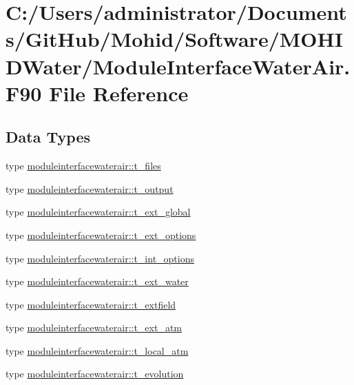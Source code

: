 \hypertarget{_module_interface_water_air_8_f90}{}\section{C\+:/\+Users/administrator/\+Documents/\+Git\+Hub/\+Mohid/\+Software/\+M\+O\+H\+I\+D\+Water/\+Module\+Interface\+Water\+Air.F90 File Reference}
\label{_module_interface_water_air_8_f90}
\subsection*{Data Types}
\begin{DoxyCompactItemize}
\item 
type \mbox{\hyperlink{structmoduleinterfacewaterair_1_1t__files}{moduleinterfacewaterair\+::t\+\_\+files}}
\item 
type \mbox{\hyperlink{structmoduleinterfacewaterair_1_1t__output}{moduleinterfacewaterair\+::t\+\_\+output}}
\item 
type \mbox{\hyperlink{structmoduleinterfacewaterair_1_1t__ext__global}{moduleinterfacewaterair\+::t\+\_\+ext\+\_\+global}}
\item 
type \mbox{\hyperlink{structmoduleinterfacewaterair_1_1t__ext__options}{moduleinterfacewaterair\+::t\+\_\+ext\+\_\+options}}
\item 
type \mbox{\hyperlink{structmoduleinterfacewaterair_1_1t__int__options}{moduleinterfacewaterair\+::t\+\_\+int\+\_\+options}}
\item 
type \mbox{\hyperlink{structmoduleinterfacewaterair_1_1t__ext__water}{moduleinterfacewaterair\+::t\+\_\+ext\+\_\+water}}
\item 
type \mbox{\hyperlink{structmoduleinterfacewaterair_1_1t__extfield}{moduleinterfacewaterair\+::t\+\_\+extfield}}
\item 
type \mbox{\hyperlink{structmoduleinterfacewaterair_1_1t__ext__atm}{moduleinterfacewaterair\+::t\+\_\+ext\+\_\+atm}}
\item 
type \mbox{\hyperlink{structmoduleinterfacewaterair_1_1t__local__atm}{moduleinterfacewaterair\+::t\+\_\+local\+\_\+atm}}
\item 
type \mbox{\hyperlink{structmoduleinterfacewaterair_1_1t__evolution}{moduleinterfacewaterair\+::t\+\_\+evolution}}
\item 

\end{DoxyCompactItemize}
